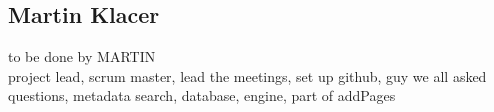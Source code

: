 \subsection{Martin Klacer}
to be done by MARTIN\\
project lead, scrum master, lead the meetings, set up github, guy we all asked questions, metadata search, database, engine, part of addPages
